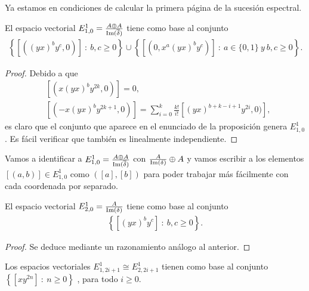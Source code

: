 \documentclass[fleqn,../tesis.tex]{subfiles}
\begin{document}
Ya estamos en condiciones de calcular la primera página de la sucesión espectral. 
\begin{prop}
	El espacio vectorial $E_{1,0}^1 = \frac{A \oplus A}{\operatorname{Im}(\overline{\delta})}$
	tiene como base al conjunto
	\begin{align*}
		\left\{ \left[((yx)^by^c, 0)\right]\ :\ b,c \geq 0\right\}
			\cup \left\{ \left[(0, x^a(yx)^by^c)\right]\ :\ a \in \{0, 1\}\ y\ b,c \geq 0\right\}. 
	\end{align*}
\end{prop}
\begin{proof}
	Debido a que
	\begin{align*}
		&\left[(x(yx)^by^{2k}, 0)\right] = 0, \\
		&\left[(-x(yx)^by^{2k + 1}, 0)\right] = \sum_{i = 0}^{k}\frac{k!}{i!}\left[(yx)^{b + k - i + 1}y^{2i}, 0)\right],
	\end{align*}
	es claro que el conjunto que aparece en el enunciado de la proposición genera $E_{1, 0}^1$. Es fácil verificar
	que también es linealmente independiente.
\end{proof}
Vamos a identificar a $E_{1,0}^1 = \frac{A \oplus A}{\operatorname{Im}(\overline{\delta})}$ con $\frac{A}{\operatorname{Im}(\delta)} \oplus A$
y vamos escribir a los elementos $\left[\left(a, b\right)\right] \in E_{1,0}^1$ como $\left(\left[a\right], \left[b\right]\right)$ para poder
trabajar más fácilmente con cada coordenada por separado.
\begin{prop}
	El espacio vectorial $E_{2,0}^1 = \frac{A}{\operatorname{Im}(\delta)}$ tiene como base al conjunto
	\begin{align*}
		\left\{ \left[(yx)^by^c\right] \ :\ b,c \geq 0\right\}. 
	\end{align*}
\end{prop}
\begin{proof}
	Se deduce mediante un razonamiento análogo al anterior.
\end{proof}
\begin{prop}
	Los espacios vectoriales $E_{1,2i + 1}^1 \cong E_{2, 2i + 1}^1$
	tienen como base al conjunto $\left\{ \left[xy^{2n}\right] \ :\ n \geq 0\right\}$ , para todo $i \geq 0$.
\end{prop}
\end{document}
